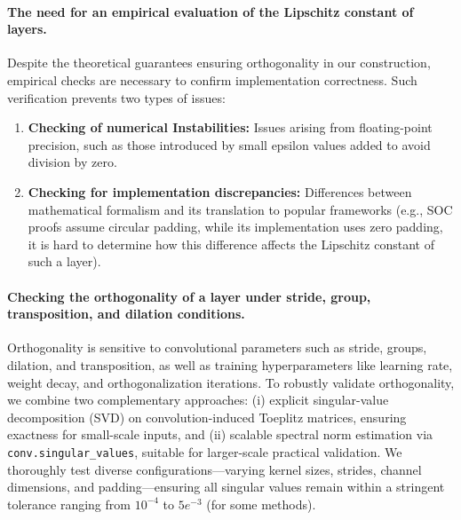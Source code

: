 \documentclass[10pt]{article}
\theoremstyle{plain}
\theoremstyle{definition}
\theoremstyle{remark}
\begin{document}
    \paragraph{The need for an empirical evaluation of the Lipschitz constant of layers.}

    Despite the theoretical guarantees ensuring orthogonality in our construction, empirical checks are necessary to confirm implementation correctness. Such verification prevents two types of issues:
    \begin{enumerate}
        \item \textbf{Checking of numerical Instabilities:} Issues arising from floating-point precision, such as those introduced by small epsilon values added to avoid division by zero.
        \item \textbf{Checking for implementation discrepancies:} Differences between mathematical formalism and its translation to popular frameworks (e.g., SOC proofs assume circular padding, while its implementation uses zero padding, it is hard to determine how this difference affects the Lipschitz constant of such a layer).
    \end{enumerate}


    \paragraph{Checking the orthogonality of a layer under stride, group, transposition, and dilation conditions.}

    Orthogonality is sensitive to convolutional parameters such as stride, groups, dilation, and transposition, as well as training hyperparameters like learning rate, weight decay, and orthogonalization iterations. To robustly validate orthogonality, we combine two complementary approaches: (i) explicit singular-value decomposition (SVD) on convolution-induced Toeplitz matrices, ensuring exactness for small-scale inputs, and (ii) scalable spectral norm estimation via \texttt{conv.singular\_values}, suitable for larger-scale practical validation. We thoroughly test diverse configurations—varying kernel sizes, strides, channel dimensions, and padding—ensuring all singular values remain within a stringent tolerance ranging from $10^{-4}$ to $5e^{-3}$ (for some methods).
\end{document}
